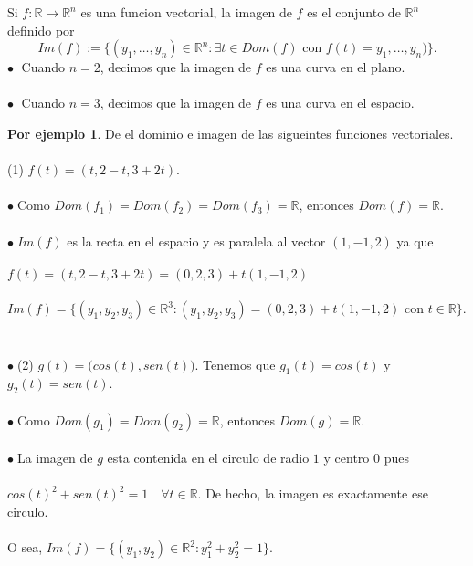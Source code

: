 \documentclass{article}
\theoremstyle{definition}
\newtheorem*{ej}{Por ejemplo}
\theoremstyle{remark}
\newcommand\bl{$\bullet\;$}
\begin{document}
\begin{defi}
  Si $f: \mathbb{R} \to \mathbb{R}^n$ es una funcion vectorial, la imagen de $f$ es el conjunto de $\mathbb{R}^n$ definido por \[ 
    Im(f) := \big\{ (y_1, \dots , y_n) \in \mathbb{R}^n : \exists t \in Dom(f)  \text{ con } f(t)=y_1, \dots, y_n)  \big\}.
    \]
    \phantom{)}\textcolor{verdep2}{\bl} Cuando $n=2$, decimos que la imagen de $f$ es una curva en el plano.\\\\
    \phantom{)}\textcolor{verdep2}{\bl} Cuando $n=3$, decimos que la imagen de $f$ es una curva en el espacio.


\end{defi}
\begin{ej}
 De el dominio e imagen de las sigueintes funciones vectoriales. \\\\ \textcolor{verdep2}{(1)} $f(t)=(t,2-t,3+2t)$. \\\\
 \bl Como $Dom(f_1)=Dom(f_2)=Dom(f_3)=\mathbb{R}$, entonces $Dom(f)=\mathbb{R}$. \\\\ 
 \bl $Im(f)$ es la recta en el espacio y es paralela al vector $(1,-1,2)$ ya que \\\\ 
 \phantom{\bl} $f(t)=(t,2-t,3+2t)=(0,2,3)+t(1,-1,2)$ \\\\
 \phantom{\bl} $Im(f)=\big\{(y_1,y_2,y_3) \in \mathbb{R}^3 : (y_1,y_2,y_3)=(0,2,3)+t(1,-1,2) \text{ con } t \in \mathbb{R}\big\}$.
 \\\\\\
\bl \textcolor{verdep2}{(2)} $g(t)=\big(cos(t), sen(t)\big)$. Tenemos que $g_1(t)=cos(t)$ y $g_2(t)=sen(t)$.\\\\ 
\bl Como $Dom(g_1)=Dom(g_2)=\mathbb{R}$, entonces $Dom(g)=\mathbb{R}$. \\\\
\bl La imagen de $g$ esta contenida en el circulo de radio $1$ y centro $0$ pues \\\\ \phantom{\bl}$cos(t)^2+sen(t)^2=1 \quad \forall t \in \mathbb{R}$. De hecho, la imagen es exactamente ese circulo. \\\\\phantom{\bl}O sea, $Im(f)=\big\{(y_1,y_2) \in \mathbb{R}^2 : y_1^2 + y_2^2 = 1\big\}$.
\end{ej}
\end{document}
